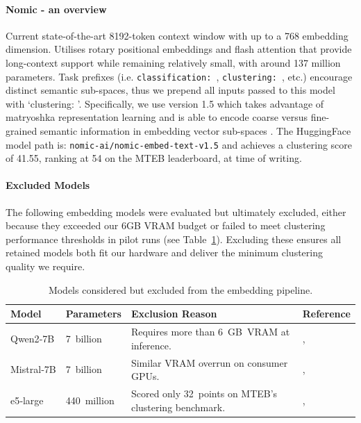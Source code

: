 \documentclass[10pt,oneside]{report}
\renewcommand{\citet}[1]{\citeauthor{#1}, \citeyear{#1}}
\begin{document}
\paragraph{Nomic - an overview}
Current state-of-the-art 8192-token context window with up to a 768 embedding dimension. Utilises rotary positional embeddings and flash attention that provide long-context support while remaining relatively small, with around 137 million parameters. Task prefixes (i.e. \texttt{classification: }, \texttt{clustering: }, etc.) encourage distinct semantic sub-spaces, thus we prepend all inputs passed to this model with `clustering: '. Specifically, we use version 1.5 which takes advantage of matryoshka representation learning and is able to encode coarse versus fine-grained semantic information in embedding vector sub-spaces \cite{nussbaum2024nomic, nussbaum2024nomic1.5}. The HuggingFace model path is: \texttt{nomic-ai/nomic-embed-text-v1.5} and achieves a clustering score of 41.55, ranking at 54 on the MTEB leaderboard, at time of writing.

\paragraph{Excluded Models}
The following embedding models were evaluated but ultimately excluded, either because they exceeded our 6GB VRAM budget or failed to meet clustering performance thresholds in pilot runs (see Table~\ref{tab:excludedModels}). Excluding these ensures all retained models both fit our hardware and deliver the minimum clustering quality we require.

\begin{table}[htbp]
    \fontsize{8}{11}\selectfont
    \centering
    \begin{adjustbox}{max width=\textwidth}
        \begin{tabular}{p{1.6cm} p{1.7cm} p{7.3cm} p{2.3cm}}
        \toprule
        \textbf{Model} & \textbf{Parameters} & \textbf{Exclusion Reason} & \textbf{Reference}\\
        \midrule
        Qwen2‑7B   & 7 billion   & Requires more than 6 GB VRAM at inference. & \citet{yang2407qwen2} \\
        Mistral‑7B & 7 billion   & Similar VRAM overrun on consumer GPUs. & \citet{wang2023improving} \\
        e5‑large   & 440 million & Scored only 32 points on MTEB’s clustering  benchmark. & \citet{wang2024multilingual}\\
        \bottomrule
        \end{tabular}
    \end{adjustbox}
    \caption{Models considered but excluded from the embedding pipeline.}
    \label{tab:excludedModels}
\end{table}
\end{document}
